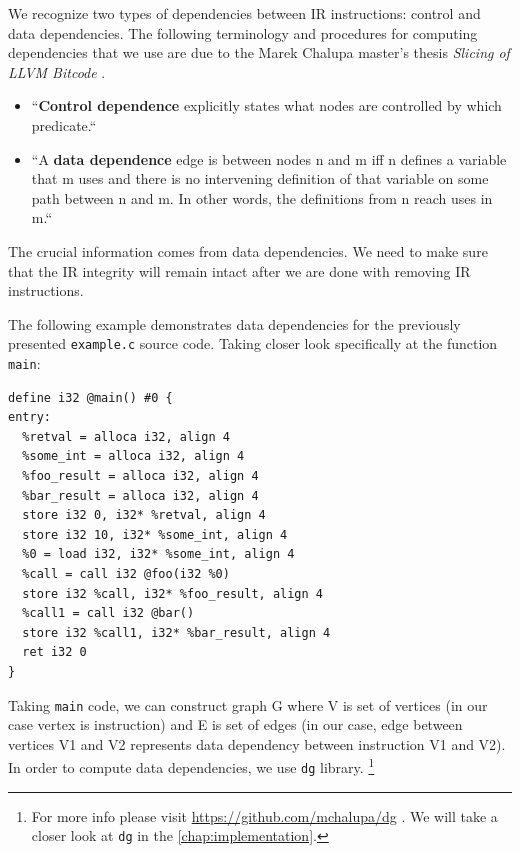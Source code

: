 \documentclass[12pt, twoside]{fithesis2}
\renewcommand{\_}{\leavevmode \kern0.07em\vbox{\hrule width0.4em}}
\newcommand{\squarebullet}{\textcolor{black}{\raisebox{0.15em}{\rule{4pt}{4pt}}}}
\newenvironment{myItemize}{
  \begin{itemize}[
    leftmargin=2em,
    rightmargin=1em,
    itemsep=\parskip,
    parsep=0em,
    topsep=0em,
    partopsep=0em
]
  \renewcommand{\labelitemi}{\squarebullet}
  \renewcommand{\labelitemii}{\textbullet}
}{
  \end{itemize}
}
\begin{document}
\bigskip

We recognize two types of dependencies between IR instructions: control and data
dependencies.
The following terminology and procedures for computing dependencies that we use
are due to the Marek Chalupa master's thesis \textit{Slicing of LLVM Bitcode}
\cite{dg}.

\begin{myItemize}
\item ``\textbf{Control dependence} explicitly states what nodes are
controlled by which predicate.``
\item ``A \textbf{data dependence} edge is between nodes n and
m iff n defines a variable that m uses and there is no intervening definition
of that variable on some path between n and m. In other words, the definitions
from n reach uses in m.``
\end{myItemize}

\bigskip

The crucial information comes from data dependencies. We need to make sure that
the IR integrity will remain intact after we are done with removing IR
instructions.

The following example demonstrates data dependencies for the
previously presented \texttt{example.c} source code.
Taking closer look specifically at the function \texttt{main}:

\begin{verbatim}
define i32 @main() #0 {
entry:
  %retval = alloca i32, align 4
  %some_int = alloca i32, align 4
  %foo_result = alloca i32, align 4
  %bar_result = alloca i32, align 4
  store i32 0, i32* %retval, align 4
  store i32 10, i32* %some_int, align 4
  %0 = load i32, i32* %some_int, align 4
  %call = call i32 @foo(i32 %0)
  store i32 %call, i32* %foo_result, align 4
  %call1 = call i32 @bar()
  store i32 %call1, i32* %bar_result, align 4
  ret i32 0
}
\end{verbatim}

Taking \texttt{main} code, we can construct graph G where V is set
of vertices (in our case vertex is instruction) and E is set of edges (in our
case, edge between vertices V1 and V2 represents data dependency between
instruction V1 and V2).
In order to compute data dependencies, we use \texttt{dg} library.
\cite{dg}
\footnote{
For more info please visit \url{https://github.com/mchalupa/dg} \cite{dg}.
We will take a closer look at \texttt{dg} in the
\autoref{chap:implementation}.
}
\end{document}
